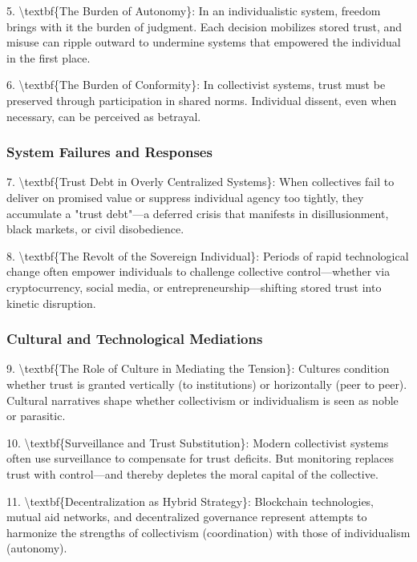 \documentclass[11pt,oneside]{book}
\begin{document}
5. \textbackslash textbf\{The Burden of Autonomy\}: In an individualistic system, freedom brings with it the burden of judgment. Each decision mobilizes stored trust, and misuse can ripple outward to undermine systems that empowered the individual in the first place.

6. \textbackslash textbf\{The Burden of Conformity\}: In collectivist systems, trust must be preserved through participation in shared norms. Individual dissent, even when necessary, can be perceived as betrayal.

\subsubsection{System Failures and Responses}

7. \textbackslash textbf\{Trust Debt in Overly Centralized Systems\}: When collectives fail to deliver on promised value or suppress individual agency too tightly, they accumulate a "trust debt"—a deferred crisis that manifests in disillusionment, black markets, or civil disobedience.

8. \textbackslash textbf\{The Revolt of the Sovereign Individual\}: Periods of rapid technological change often empower individuals to challenge collective control—whether via cryptocurrency, social media, or entrepreneurship—shifting stored trust into kinetic disruption.

\subsubsection{Cultural and Technological Mediations}

9. \textbackslash textbf\{The Role of Culture in Mediating the Tension\}: Cultures condition whether trust is granted vertically (to institutions) or horizontally (peer to peer). Cultural narratives shape whether collectivism or individualism is seen as noble or parasitic.

10. \textbackslash textbf\{Surveillance and Trust Substitution\}: Modern collectivist systems often use surveillance to compensate for trust deficits. But monitoring replaces trust with control—and thereby depletes the moral capital of the collective.

11. \textbackslash textbf\{Decentralization as Hybrid Strategy\}: Blockchain technologies, mutual aid networks, and decentralized governance represent attempts to harmonize the strengths of collectivism (coordination) with those of individualism (autonomy).
\end{document}
